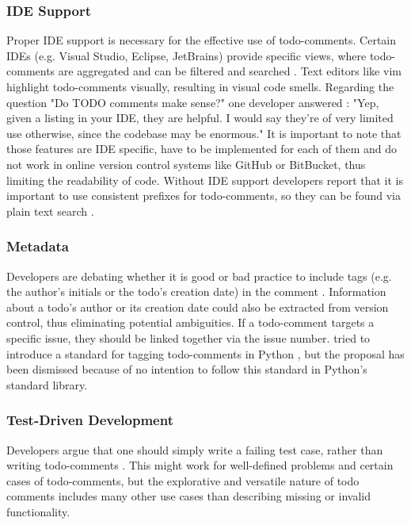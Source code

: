 \subsubsection{IDE Support}
Proper IDE support is necessary for the effective use of todo-comments.
Certain IDEs (e.g. Visual Studio, Eclipse, JetBrains) provide specific views, where todo-comments are aggregated and can be filtered and searched \cite{storey_how_2009}.
Text editors like vim highlight todo-comments visually, resulting in visual code smells.
Regarding the question "Do TODO comments make sense?" one developer answered \cite{karacic_todo_2015}: "Yep, given a listing in your IDE, they are helpful. I would say they're of very limited use otherwise, since the codebase may be enormous."
It is important to note that those features are IDE specific, have to be implemented for each of them and do not work in online version control systems like GitHub or BitBucket, thus limiting the readability of code.
Without IDE support developers report that it is important to use consistent prefixes for todo-comments, so they can be found via plain text search \cite{karacic_todo_2015}.

\subsubsection{Metadata}
Developers are debating whether it is good or bad practice to include tags (e.g. the author's initials or the todo's creation date) in the comment \cite{karacic_todo_2015}.
Information about a todo's author or its creation date could also be extracted from version control, thus eliminating potential ambiguities.
If a todo-comment targets a specific issue, they should be linked together via the issue number.
\citeauthor{elliott_pep_2005} tried to introduce a standard for tagging todo-comments in Python \cite{elliott_pep_2005}, but the proposal has been dismissed because of no intention to follow this standard in Python's standard library.

\subsubsection{Test-Driven Development}
Developers argue that one should simply write a failing test case, rather than writing todo-comments \cite{snoop_does_2016}.
This might work for well-defined problems and certain cases of todo-comments, but the explorative and versatile nature of todo comments includes many other use cases than describing missing or invalid functionality.

